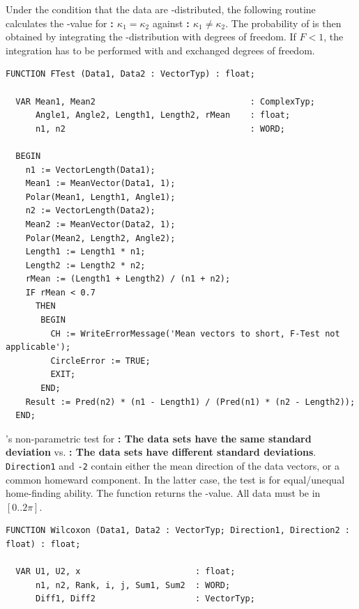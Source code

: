 \begin{refsection}
Under the condition that the data are -distributed, the following routine calculates the -value for \textbf{: \( \kappa_1 = \kappa_2 \)} against \textbf{: \( \kappa_1 \neq \kappa_2 \)}. The probability of  is then obtained by integrating the -distribution with  degrees of freedom. If \( F < 1 \), the integration has to be performed with  and exchanged degrees of freedom.

\begin{lstlisting}[caption=F-test]
  FUNCTION FTest (Data1, Data2 : VectorTyp) : float;

  VAR Mean1, Mean2                               : ComplexTyp;
      Angle1, Angle2, Length1, Length2, rMean    : float;
      n1, n2                                     : WORD;

  BEGIN
    n1 := VectorLength(Data1);
    Mean1 := MeanVector(Data1, 1);
    Polar(Mean1, Length1, Angle1);
    n2 := VectorLength(Data2);
    Mean2 := MeanVector(Data2, 1);
    Polar(Mean2, Length2, Angle2);
    Length1 := Length1 * n1;
    Length2 := Length2 * n2;
    rMean := (Length1 + Length2) / (n1 + n2);
    IF rMean < 0.7
      THEN
       BEGIN
         CH := WriteErrorMessage('Mean vectors to short, F-Test not applicable');
         CircleError := TRUE;
         EXIT;
       END;
    Result := Pred(n2) * (n1 - Length1) / (Pred(n1) * (n2 - Length2));
  END;
\end{lstlisting}

's non-parametric test for \textbf{: The data sets have the same standard deviation} vs. \textbf{: The data sets have different standard deviations}. \texttt{Direction1} and \texttt{-2} contain either the mean direction of the data vectors, or a common homeward component. In the latter case, the test is for equal/unequal home-finding ability. The function returns the  -value. All data must be in \( [0..2\pi] \).

\begin{lstlisting}[caption=Wilcoxon's non-parametric test for equal standard deviation]
  FUNCTION Wilcoxon (Data1, Data2 : VectorTyp; Direction1, Direction2 : float) : float;

  VAR U1, U2, x                       : float;
      n1, n2, Rank, i, j, Sum1, Sum2  : WORD;
      Diff1, Diff2                    : VectorTyp;


\end{lstlisting}
\end{refsection}
